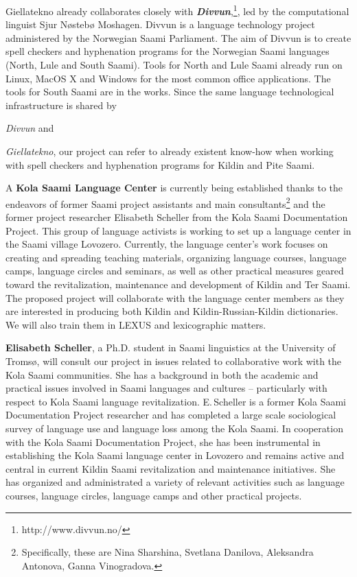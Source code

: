 \documentclass[a4paper,12pt]{article}
\begin{document}
Giellatekno already collaborates closely with \textit{\textbf{Divvun}},\footnote{http://www.divvun.no/}, led by the computational linguist Sjur Nøstebø Moshagen. Divvun is a language technology project administered by the Norwegian Saami Parliament. The aim of Divvun is to create spell checkers and hyphenation programs for the Norwegian Saami languages (North, Lule and South Saami). Tools for North and Lule Saami already run on Linux, MacOS X and Windows for the most common office applications. The tools for South Saami are in the works. Since the same language technological infrastructure is shared by {\textit{Divvun} and {\textit{Giellatekno}, our project can refer to already existent know-how when working with spell checkers and hyphenation programs for Kildin and Pite Saami.

A {\bf Kola Saami Language Center} is currently being established thanks to the endeavors of former Saami project assistants and main consultants\footnote{Specifically, these are Nina Sharshina, Svetlana Danilova, Aleksandra Antonova, Ganna Vinogradova.} and the former project researcher Elisabeth Scheller from the Kola Saami Documentation Project. This group of language activists is working to set up a language center in the Saami village Lovozero. Currently, the language center’s work focuses on creating and spreading teaching materials, organizing language courses, language camps, language circles and seminars, as well as other practical measures geared toward the revitalization, maintenance and development of Kildin and Ter Saami. The proposed project will collaborate with the language center members as they are interested in producing both Kildin and Kildin-Russian-Kildin dictionaries. We will also train them in LEXUS and lexicographic matters.

{\bf Elisabeth Scheller}, a Ph.D. student in Saami linguistics at the University of Tromsø, will consult our project in issues related to collaborative work with the Kola Saami communities. She has a background in both the academic and practical issues involved in Saami languages and cultures – particularly with respect to Kola Saami language revitalization. E.\,Scheller is a former Kola Saami Documentation Project researcher and has completed a large scale sociological survey of language use and language loss among the Kola Saami. In cooperation with the Kola Saami Documentation Project, she has been instrumental in establishing the Kola Saami language center in Lovozero and remains active and central in current Kildin Saami revitalization and maintenance initiatives. She has organized and administrated a variety of relevant activities such as language courses, language circles, language camps and other practical projects.

}}
\end{document}
